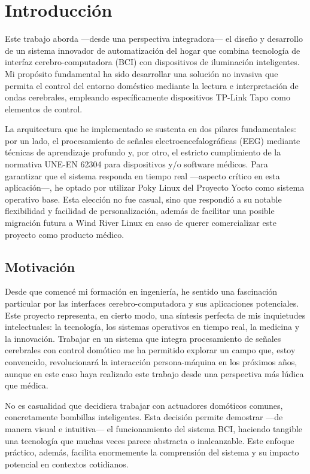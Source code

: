\chapter{Introducción}

Este trabajo aborda —desde una perspectiva integradora— el diseño y desarrollo de un sistema innovador de automatización del hogar que combina tecnología de interfaz cerebro-computadora (BCI) con dispositivos de iluminación inteligentes. Mi propósito fundamental ha sido desarrollar una solución no invasiva que permita el control del entorno doméstico mediante la lectura e interpretación de ondas cerebrales, empleando específicamente dispositivos TP-Link Tapo como elementos de control.

La arquitectura que he implementado se sustenta en dos pilares fundamentales: por un lado, el procesamiento de señales electroencefalográficas (EEG) mediante técnicas de aprendizaje profundo y, por otro, el estricto cumplimiento de la normativa UNE-EN 62304 para dispositivos y/o software médicos. Para garantizar que el sistema responda en tiempo real —aspecto crítico en esta aplicación—, he optado por utilizar Poky Linux del Proyecto Yocto como sistema operativo base. Esta elección no fue casual, sino que respondió a su notable flexibilidad y facilidad de personalización, además de facilitar una posible migración futura a Wind River Linux en caso de querer comercializar este proyecto como producto médico.

\section{Motivación}
Desde que comencé mi formación en ingeniería, he sentido una fascinación particular por las interfaces cerebro-computadora y sus aplicaciones potenciales. Este proyecto representa, en cierto modo, una síntesis perfecta de mis inquietudes intelectuales: la tecnología, los sistemas operativos en tiempo real, la medicina y la innovación. Trabajar en un sistema que integra procesamiento de señales cerebrales con control domótico me ha permitido explorar un campo que, estoy convencido, revolucionará la interacción persona-máquina en los próximos años, aunque en este caso haya realizado este trabajo desde una perspectiva más lúdica que médica.

No es casualidad que decidiera trabajar con actuadores domóticos comunes, concretamente bombillas inteligentes. Esta decisión permite demostrar —de manera visual e intuitiva— el funcionamiento del sistema BCI, haciendo tangible una tecnología que muchas veces parece abstracta o inalcanzable. Este enfoque práctico, además, facilita enormemente la comprensión del sistema y su impacto potencial en contextos cotidianos.


